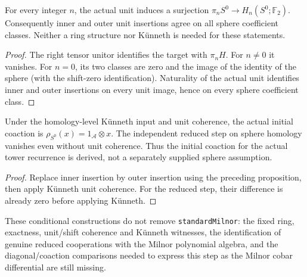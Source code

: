 \begin{proposition}
  \label{prop:h6-sphere-unit-image}
  \leanok
  For every integer $n$, the actual unit induces a surjection
  $\pi_nS^0\to H_n(S^0;\mathbb F_2)$. Consequently inner and outer unit
  insertions agree on all sphere coefficient classes. Neither a ring
  structure nor K\"unneth is needed for these statements.
\end{proposition}
\begin{proof}
  The right tensor unitor identifies the target with $\pi_nH$. For
  $n\ne0$ it vanishes. For $n=0$, its two classes are zero and the image
  of the identity of the sphere (with the shift-zero identification).
  Naturality of the actual unit identifies inner and outer insertions
  on every unit image, hence on every sphere coefficient class.
  \leanok
\end{proof}

\begin{proposition}
  \label{prop:h6-sphere-initial-coaction}
  \leanok
  Under the homology-level K\"unneth input and unit coherence, the actual
  initial coaction is $\rho_{S^0}(x)=1_{\mathcal A}\otimes x$.
  The independent reduced step on sphere homology vanishes even without
  unit coherence. Thus the initial coaction for the actual tower
  recurrence is derived, not a separately supplied sphere assumption.
\end{proposition}
\begin{proof}
  Replace inner insertion by outer insertion using the preceding
  proposition, then apply K\"unneth unit coherence. For the reduced step,
  their difference is already zero before applying K\"unneth.
  \leanok
\end{proof}

These conditional constructions do not remove \texttt{standardMilnor}:
the fixed ring, exactness, unit/shift coherence and K\"unneth witnesses,
the identification of genuine reduced cooperations with the Milnor
polynomial algebra, and the diagonal/coaction comparisons needed to
express this step as the Milnor cobar differential are still missing.

